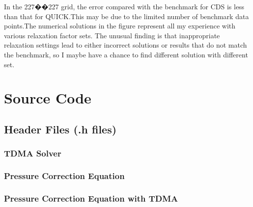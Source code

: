 \documentclass[12pt]{article}
\theoremstyle{plain}  %
\theoremstyle{definition}  %
\renewcommand{\thesection}{\arabic{section}}
\renewcommand{\thesubsection}{\thesection.\arabic{subsection}}
\renewcommand{\thesubsubsection}{\thesubsection.\arabic{subsubsection}}
\renewcommand{\theequation}{\thesection.\arabic{equation}}
\renewcommand{\thefigure}{\thesection.\arabic{figure}}
\renewcommand{\thetable}{\thesection.\arabic{table}}
\begin{document}
In the 227��227 grid, the error compared with the benchmark for CDS is less than that for  QUICK.This may be due to the limited number of benchmark data points.The numerical solutions in the figure represent all my experience with various relaxation factor sets. The unusual finding is that inappropriate relaxation settings lead to either incorrect solutions or results that do not match the benchmark, so I maybe have a chance to find different solution with different set.

\newpage
\appendix
\renewcommand{\thesection}{\Alph{section}}
\renewcommand{\thesubsection}{\thesection.\arabic{subsection}}
\renewcommand{\thesubsubsection}{\thesubsection.\arabic{subsubsection}}
\renewcommand{\theequation}{\thesection.\arabic{equation}}
\renewcommand{\thefigure}{\thesection.\arabic{figure}}
\renewcommand{\thetable}{\thesection.\arabic{table}}

\section{Source Code}
\label{app:source_code}

\subsection{Header Files (.h files)}

\subsubsection{TDMA Solver}
\label{subsec:code1} 


\subsubsection{Pressure Correction Equation}
\label{subsec:code2} 


\subsubsection{Pressure Correction Equation with TDMA}
\label{subsec:code3} 

\end{document}
